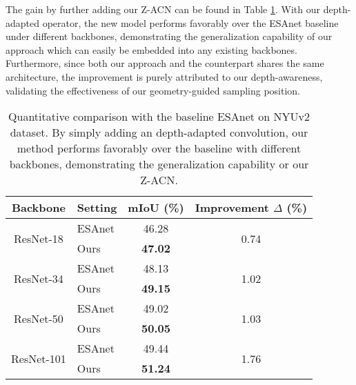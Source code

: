 \documentclass[lettersize,journal]{IEEEtran}
\begin{document}
The gain by further adding our Z-ACN can be found in Table \ref{esaresnet}. With our depth-adapted operator, the new model performs favorably over the ESAnet baseline under different backbones, demonstrating the generalization capability of our approach which can easily be embedded into any existing backbones. Furthermore, since both our approach and the counterpart shares the same architecture, the improvement is purely attributed to our depth-awareness, validating the effectiveness of our geometry-guided sampling position.


\begin{table}[t]
\centering
\setlength\tabcolsep{8pt}
\setlength\extrarowheight{0pt}
\caption{Quantitative comparison with the baseline ESAnet on NYUv2 dataset. By simply adding an depth-adapted convolution, our method performs favorably over the baseline with different backbones, demonstrating the generalization capability or our Z-ACN.}
\begin{tabular}[ht]{c |l | c| c }
\hline

\hline
Backbone & Setting   & mIoU (\%)  & Improvement $\Delta$ (\%) \\
\hline
\multirow{2}{*}{ResNet-18}
& ESAnet& 46.28 & \multirow{2}{*}{0.74}\\
& Ours &\textbf{47.02} \\

\hline
\multirow{2}{*}{ResNet-34}
& ESAnet& 48.13& \multirow{2}{*}{1.02}\\
& Ours &\textbf{49.15}\\

\hline
\multirow{2}{*}{ResNet-50}
& ESAnet& 49.02&\multirow{2}{*}{1.03}\\
& Ours &\textbf{50.05}\\

\hline
\multirow{2}{*}{ResNet-101}
& ESAnet & 49.44& \multirow{2}{*}{1.76}\\
& Ours &\textbf{51.24}\\

\hline

\hline

\hline
\end{tabular}

\label{esaresnet}
\end{table}
\end{document}
